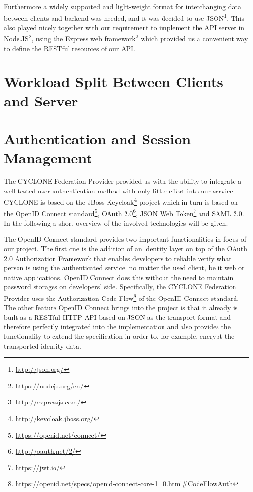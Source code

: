 Furthermore a widely supported and light-weight format for interchanging data between clients and backend was needed, and it was decided to use JSON\footnote{\url{http://json.org/}}. This also played nicely together with our requirement to implement the API server in Node.JS\footnote{\url{https://nodejs.org/en/}}, using the Express web framework\footnote{\url{http://expressjs.com/}} which provided us a convenient way to define the RESTful resources of our API.


\vspace{0.5cm}

\section{Workload Split Between Clients and Server}


\vspace{0.5cm}

\section{Authentication and Session Management}

The CYCLONE Federation Provider provided us with the ability to integrate a well-tested user authentication method with only little effort into our service. CYCLONE is based on the JBoss Keycloak\footnote{\url{http://keycloak.jboss.org/}} project which in turn is based on the OpenID Connect standard\footnote{\url{https://openid.net/connect/}}, OAuth 2.0\footnote{\url{http://oauth.net/2/}}, JSON Web Token\footnote{\url{https://jwt.io/}} and SAML 2.0. In the following a short overview of the involved technologies will be given.

The OpenID Connect standard provides two important functionalities in focus of our project. The first one is the addition of an identity layer on top of the OAuth 2.0 Authorization Framework that enables developers to reliable verify what person is using the authenticated service, no matter the used client, be it web or native applications. OpenID Connect does this without the need to maintain password storages on developers' side. Specifically, the CYCLONE Federation Provider uses the Authorization Code Flow\footnote{\url{https://openid.net/specs/openid-connect-core-1_0.html\#CodeFlowAuth}} of the OpenID Connect standard. The other feature OpenID Connect brings into the project is that it already is built as a RESTful HTTP API based on JSON as the transport format and therefore perfectly integrated into the implementation and also provides the functionality to extend the specification in order to, for example, encrypt the transported identity data.

